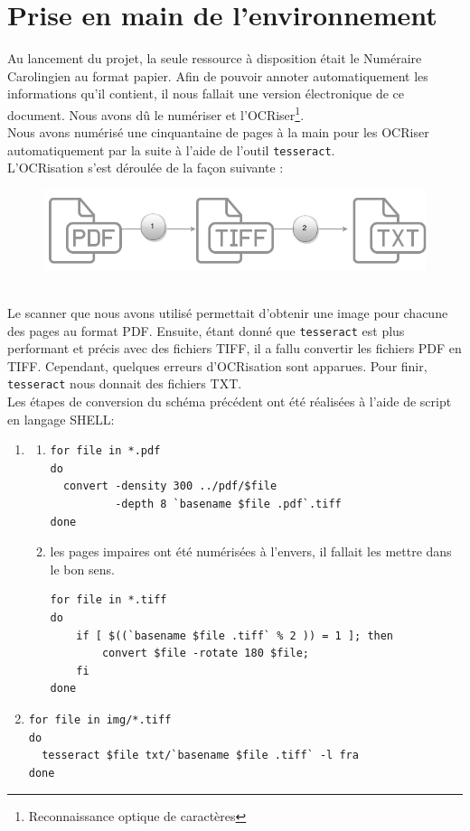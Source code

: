 \documentclass[a4paper, 11pt]{report}
\begin{document}
    \section{Prise en main de l'environnement}
    Au lancement du projet, la seule ressource à disposition était le Numéraire Carolingien au format papier. Afin de pouvoir annoter automatiquement les informations qu'il contient, il nous fallait une version électronique de ce document. Nous avons dû le numériser et l'OCRiser\footnote{Reconnaissance optique de caractères}.\\
    Nous avons numérisé une cinquantaine de pages à la main pour les OCRiser automatiquement par la suite à l'aide de l'outil \texttt{tesseract}.\\

    L'OCRisation s'est déroulée de la façon suivante : 
    \begin{figure}[h]
    \centering
    \includegraphics[scale=.3]{img/OCRisation.png}
    \end{figure}\\
    Le scanner que nous avons utilisé permettait d'obtenir une image pour chacune des pages au format PDF. Ensuite, étant donné que  \texttt{tesseract} est plus performant et précis avec des fichiers TIFF, il a fallu convertir les fichiers PDF en TIFF. Cependant, quelques erreurs d'OCRisation sont apparues. Pour finir,  \texttt{tesseract} nous donnait des fichiers TXT.\\
    Les étapes de conversion du schéma précédent ont été réalisées à l'aide de script en langage SHELL:
    \begin{enumerate}
        \item \begin{enumerate}
              \item 
           \begin{verbatim}
for file in *.pdf
do
  convert -density 300 ../pdf/$file
          -depth 8 `basename $file .pdf`.tiff
done
           \end{verbatim}
          \item les pages impaires ont été numérisées à l'envers, il fallait les mettre dans le bon sens.
          \begin{verbatim}
for file in *.tiff
do
    if [ $((`basename $file .tiff` % 2 )) = 1 ]; then
        convert $file -rotate 180 $file;
    fi
done
          \end{verbatim}
       \end{enumerate}
    \item 
    \begin{verbatim}
for file in img/*.tiff
do
  tesseract $file txt/`basename $file .tiff` -l fra
done 
    \end{verbatim}
    \end{enumerate}
    
\end{document}

